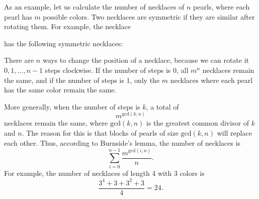 As an example, let us calculate the number of
necklaces of $n$ pearls,
where each pearl has $m$ possible colors.
Two necklaces are symmetric if they are
similar after rotating them.
For example, the necklace
\begin{center}
\end{center}
has the following symmetric necklaces:
\begin{center}
\end{center}
There are $n$ ways to change the position
of a necklace,
because we can rotate it
$0,1,\ldots,n-1$ steps clockwise.
If the number of steps is 0,
all $m^n$ necklaces remain the same,
and if the number of steps is 1,
only the $m$ necklaces where each
pearl has the same color remain the same.

More generally, when the number of steps is $k$,
a total of
\[m^{\textrm{gcd}(k,n)}\]
necklaces remain the same,
where $\textrm{gcd}(k,n)$ is the greatest common
divisor of $k$ and $n$.
The reason for this is that blocks
of pearls of size $\textrm{gcd}(k,n)$
will replace each other.
Thus, according to Burnside's lemma,
the number of necklaces is
\[\sum_{i=0}^{n-1} \frac{m^{\textrm{gcd}(i,n)}}{n}. \]
For example, the number of necklaces of length 4
with 3 colors is
\[\frac{3^4+3+3^2+3}{4} = 24. \]

